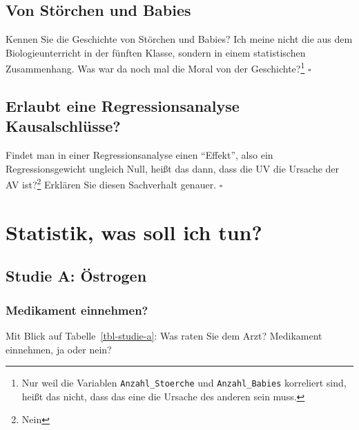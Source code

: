 \documentclass[
  ngerman,
  letterpaper,
  twoside,
  open=any]{scrbook}
\theoremstyle{definition}
\theoremstyle{plain}
\theoremstyle{definition}
\theoremstyle{definition}
\theoremstyle{definition}
\theoremstyle{definition}
\theoremstyle{remark}
\begin{document}
\subsection{Von Störchen und Babies}\label{von-stuxf6rchen-und-babies}

Kennen Sie die Geschichte von Störchen und Babies? Ich meine nicht die
aus dem Biologieunterricht in der fünften Klasse, sondern in einem
statistischen Zusammenhang. Was war da noch mal die Moral von der
Geschichte?\footnote{Nur weil die Variablen \texttt{Anzahl\_Stoerche}
  und \texttt{Anzahl\_Babies} korreliert sind, heißt das nicht, dass das
  eine die Ursache des anderen sein muss.} \(\square\)

\subsection{Erlaubt eine Regressionsanalyse
Kausalschlüsse?}\label{erlaubt-eine-regressionsanalyse-kausalschluxfcsse}

Findet man in einer Regressionsanalyse einen \enquote{Effekt}, also ein
Regressionsgewicht ungleich Null, heißt das dann, dass die UV die
Ursache der AV ist?\footnote{Nein} Erklären Sie diesen Sachverhalt
genauer. \(\square\)

\section{Statistik, was soll ich tun?}\label{statistik-was-soll-ich-tun}

\subsection{Studie A: Östrogen}\label{studie-a-uxf6strogen-1}

\subsubsection{Medikament einnehmen?}\label{medikament-einnehmen}

Mit Blick auf Tabelle~\ref{tbl-studie-a}: Was raten Sie dem Arzt?
Medikament einnehmen, ja oder nein?

\begin{table}

\caption{\label{tbl-studie-a}Daten zur Studie A}


\end{table}%
\end{document}

